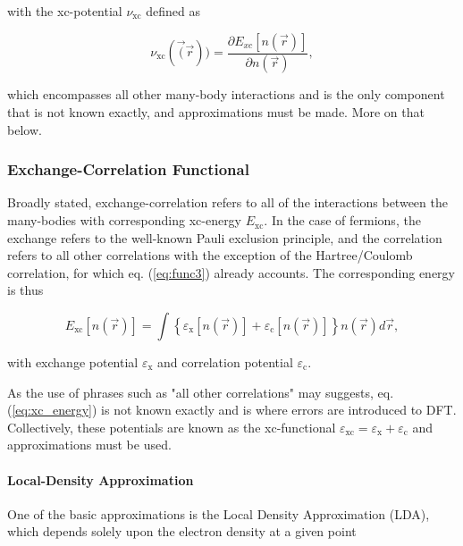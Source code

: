         \noindent with the xc-potential $\nu_\text{xc}$ defined as
        
        \begin{equation}
            \nu_\text{xc}(\vec(\vec{r})) = \frac{\partial E_{xc}[n(\vec{r})]}{\partial n(\vec{r})},
        \end{equation}
        
        \noindent which encompasses all other many-body interactions and is the only component that is not known exactly, and approximations must be made. More on that below.
        
        \subsubsection{Exchange-Correlation Functional}
        
        Broadly stated, exchange-correlation refers to all of the interactions between the many-bodies with corresponding xc-energy $E_\text{xc}$. In the case of fermions, the exchange refers to the well-known Pauli exclusion principle, and the correlation refers to all other correlations with the exception of the Hartree/Coulomb correlation, for which eq. (\ref{eq:func3}) already accounts. The corresponding energy is thus
        
        \begin{equation}
            \label{eq:xc_energy}
            E_\text{xc}[n(\Vec{r})]= \int \left\{ \varepsilon_\text{x}[n(\Vec{r})] + \varepsilon_\text{c}[n(\Vec{r})]\right\} n(\vec{r})d\vec{r},
        \end{equation}
        
        \noindent with exchange potential $\varepsilon_\text{x}$ and correlation potential $\varepsilon_\text{c}$.
        
        As the use of phrases such as "all other correlations" may suggests, eq. (\ref{eq:xc_energy}) is not known exactly and is where errors are introduced to DFT. Collectively, these potentials are known as the xc-functional $\varepsilon_\text{xc} = \varepsilon_\text{x} + \varepsilon_\text{c}$ and approximations must be used.
        
        \paragraph{Local-Density Approximation} One of the basic approximations is the Local Density Approximation (LDA), which depends solely upon the electron density at a given point
        
